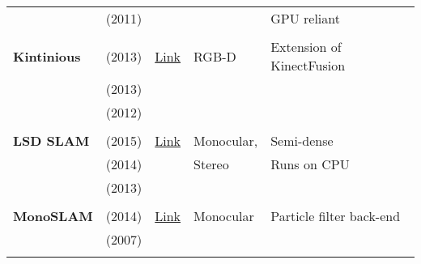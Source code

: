\documentclass[a4paper,12pt]{scrartcl}
\begin{document}
{\begin{longtable}{l|l|l|l|l}
                           & \cite{Newcombe2011a} (2011)       &                                                                    &                       & GPU reliant\\
                           &                                   &                                                                    &                       &\\
    \textbf{Kintinious}    & \cite{Whelan2013a} (2013)         & {\href{https://github.com/mp3guy/Kintinuous}{Link}}                & RGB-D                 & Extension of KinectFusion\\
                           & \cite{Whelan2013} (2013)          &                                                                    &                       &\\
                           & \cite{Whelan2012} (2012)          &                                                                    &                       &\\
                           &                                   &                                                                    &                       &\\
    \textbf{LSD SLAM}      & \cite{Engel2015} (2015)           & {\href{https://github.com/tum-vision/lsd_slam}{Link}}              & Monocular,            & Semi-dense\\
                           & \cite{Engel2014} (2014)           &                                                                    & Stereo                & Runs on CPU\\
                           & \cite{Engel2013} (2013)           &                                                                    &                       &\\
                           &                                   &                                                                    &                       &\\
    \textbf{MonoSLAM}      & \cite{Russo2014} (2014)           & {\href{https://github.com/rrg-polito/mono-slam}{Link}}             & Monocular             & Particle filter back-end\\
                           & \cite{Davison2007} (2007)         &                                                                    &                       &\\
                           &                                   &                                                                    &                       &\\

\end{longtable}}
\end{document}
